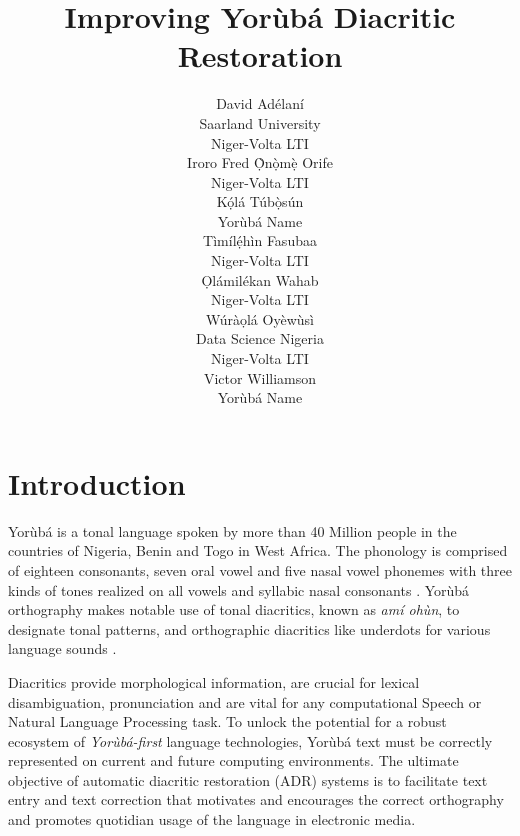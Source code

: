 \documentclass{article} %
\title{Improving Yor{\`u}b{\'a} Diacritic Restoration}
\author{David Ad{\'e}lan{\'i} \\
Saarland University\\
Niger-Volta LTI \\
\And
Iroro Fred \d{\`O}n\d{\`o}m\d{\`e} Orife \\
Niger-Volta LTI\\
\And
K\d{\'{o}}l\'{a} T\'{u}b\d{\`{o}}s\'{u}n \\
Yor{\`u}b{\'a} Name \\
\And
T{\`i}m{\'i}l\d{\'{e}}h{\`i}n Fasubaa \\
Niger-Volta LTI \\
\And
\d{O}l{\'a}mil{\'e}kan Wahab \\
Niger-Volta LTI \\
\And
W{\'u}r{\`a}\d{o}l{\'a} Oy{\`e}w{\`u}s{\`i} \\
Data Science Nigeria \\
Niger-Volta LTI \\
\And
Victor Williamson \\
Yor{\`u}b{\'a} Name \\
}
\begin{document}
\maketitle


\section{Introduction}\label{sec:introduction}

Yor{\`u}b{\'a} is a tonal language spoken by more than 40 Million people in the countries of Nigeria, Benin and Togo in West Africa. The phonology is comprised of eighteen consonants, seven oral vowel and five nasal vowel phonemes with three kinds of tones realized on all vowels and syllabic nasal consonants \citep{akinlabi2004sound}. Yor{\`u}b{\'a} orthography makes notable use of tonal diacritics, known as \emph{am{\'i} oh{\`u}n}, to designate tonal patterns, and orthographic diacritics like underdots for various language sounds \citep{adegbola2012quantifying, wells2000orthographic}.

Diacritics provide morphological information, are crucial for lexical disambiguation, pronunciation and are vital for any computational Speech or Natural Language Processing  task. To unlock the potential for a robust ecosystem of \emph{Yor{\`u}b{\'a}-first} language technologies, Yor{\`u}b{\'a} text must be correctly represented on current and future computing environments. The ultimate objective of automatic diacritic restoration (ADR) systems is to facilitate text entry and text correction that motivates and encourages the correct orthography and promotes quotidian usage of the language in electronic media.
\end{document}
